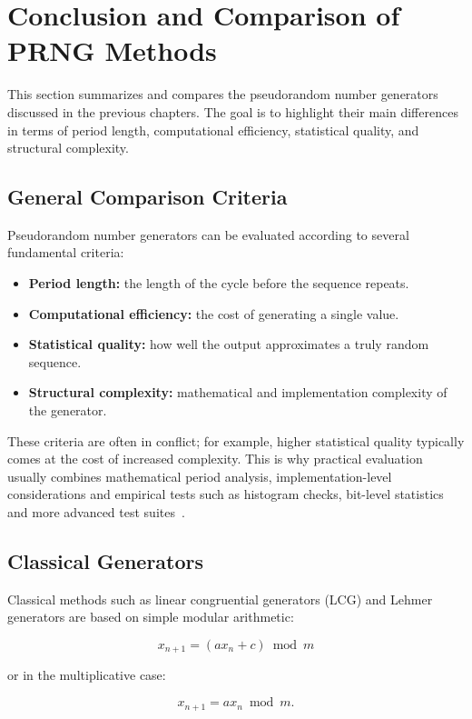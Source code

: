 
\section{Conclusion and Comparison of PRNG Methods}

This section summarizes and compares the pseudorandom number generators discussed in the previous chapters. The goal is to highlight their main differences in terms of period length, computational efficiency, statistical quality, and structural complexity.

\subsection{General Comparison Criteria}

Pseudorandom number generators can be evaluated according to several fundamental criteria:

\begin{itemize}
    \item \textbf{Period length:} the length of the cycle before the sequence repeats.
    \item \textbf{Computational efficiency:} the cost of generating a single value.
    \item \textbf{Statistical quality:} how well the output approximates a truly random sequence.
    \item \textbf{Structural complexity:} mathematical and implementation complexity of the generator.
\end{itemize}

These criteria are often in conflict; for example, higher statistical quality typically comes at the cost of increased complexity. This is why practical evaluation usually combines mathematical period analysis, implementation-level considerations and empirical tests such as histogram checks, bit-level statistics and more advanced test suites~\cite{knuth1997art,lecuyer2007testu01}.

\subsection{Classical Generators}

Classical methods such as linear congruential generators (LCG) and Lehmer generators are based on simple modular arithmetic:

\[
x_{n+1} = (ax_n + c) \bmod m
\]

or in the multiplicative case:

\[
x_{n+1} = ax_n \bmod m.
\]

